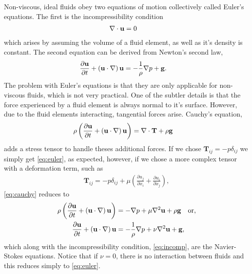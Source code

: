 \documentclass[10pt, titlepage]{article}
\begin{document}
Non-viscous, ideal fluids obey two equations of motion collectively called Euler's equations. The first is the incompressibility condition 
\begin{align}
\nabla \cdot \bf{u} &= 0
\label{eq:incomp}
\end{align}
which arises by assuming the volume of a fluid element, as well as it's density is constant. The second equation can be derived from Newton's second law, 
\begin{align}
\frac{\partial \bf{u}}{\partial t} + \left( \bf{u} \cdot \nabla \right) \bf{u} &= - \frac{1}{\rho} \nabla p + \bf{g}. \label{eq:euler}
\end{align}
The problem with Euler's equations is that they are only applicable for non-viscous fluids, which is not very practical. One of the subtler details is that the force experienced by a fluid element is always normal to it's surface. However, due to the fluid elements interacting, tangential forces arise. Cauchy's equation,
\begin{align}
\rho \left( \frac{\partial \bf{u}}{\partial t} + \left( \bf{u} \cdot \nabla \right) \bf{u} \right) &= \nabla \cdot \bf{T} + \rho \bf{g}
\label{eq:cauchy}
\end{align}
adds a stress tensor to handle theses additional forces. If we chose $\textbf{T}_{ij} = -p \delta_{ij}$ we simply get \eqref{eq:euler}, as expected, however, if we chose a more complex tensor with a deformation term, such as
\begin{align*}
\textbf{T}_{ij} = -p \delta_{ij} + \mu \left( \frac{\partial u_j}{\partial x_i} + \frac{\partial u_i}{\partial x_j} \right),
\end{align*}
\eqref{eq:cauchy} reduces to 
\begin{align}
\rho \left( \frac{\partial \bf{u}}{\partial t} + \left( \bf{u} \cdot \nabla \right) \bf{u} \right) &= - \nabla p + \mu \nabla^2 \bf{u} + \rho \bf{g} \quad \text{or,} \nonumber \\
\frac{\partial \bf{u}}{\partial t} + \left( \bf{u} \cdot \nabla \right) \bf{u} &= - \frac{1}{\rho} \nabla p + \nu \nabla^2 \bf{u} + \bf{g}, \label{eq:NSE}
\end{align}
which along with the incompressibility condition, \eqref{eq:incomp}, are the Navier-Stokes equations. Notice that if $\nu = 0$, there is no interaction between fluids and this reduces simply to \eqref{eq:euler}. 
\end{document}
